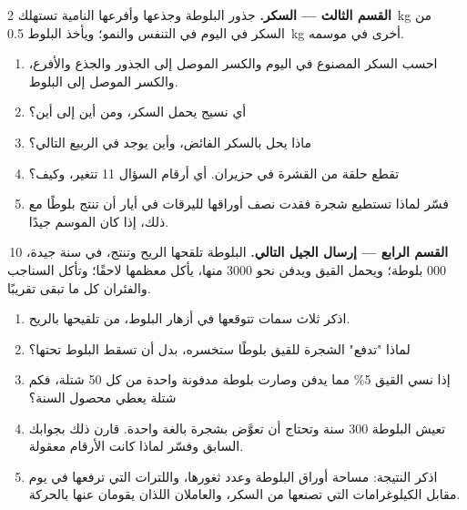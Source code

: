 \begin{problem}
\medskip
\noindent\textbf{القسم الثالث --- السكر.}
جذور البلوطة وجذعها وأفرعها النامية تستهلك \qty{2}{kg} من السكر في
اليوم في التنفس والنمو؛ ويأخذ البلوط \qty{0.5}{kg} أخرى في موسمه.
\begin{enumerate}[resume]
  \item احسب السكر المصنوع في اليوم والكسر الموصل إلى الجذور والجذع
        والأفرع، والكسر الموصل إلى البلوط.
  \item أي نسيج يحمل السكر، ومن أين إلى أين؟
  \item ماذا يحل بالسكر الفائض، وأين يوجد في الربيع التالي؟
  \item تقطع حلقة من القشرة في حزيران. أي أرقام السؤال 11 تتغير، وكيف؟
  \item فسّر لماذا تستطيع شجرة فقدت نصف أوراقها لليرقات في أيار أن
        تنتج بلوطًا مع ذلك، إذا كان الموسم جيدًا.
\end{enumerate}

\medskip
\noindent\textbf{القسم الرابع --- إرسال الجيل التالي.}
البلوطة تلقحها الريح وتنتج، في سنة جيدة، 10\,000 بلوطة؛ ويحمل القيق
ويدفن نحو 3000 منها، يأكل معظمها لاحقًا؛ وتأكل السناجب والفئران كل ما
تبقى تقريبًا.
\begin{enumerate}[resume]
  \item اذكر ثلاث سمات تتوقعها في أزهار البلوط، من تلقيحها بالريح.
  \item لماذا "تدفع" الشجرة للقيق بلوطًا ستخسره، بدل أن تسقط البلوط
        تحتها؟
  \item إذا نسي القيق 5\% مما يدفن وصارت بلوطة مدفونة واحدة من كل 50
        شتلة، فكم شتلة يعطي محصول السنة؟
  \item تعيش البلوطة 300 سنة وتحتاج أن تعوَّض بشجرة بالغة واحدة. قارن
        ذلك بجوابك السابق وفسّر لماذا كانت الأرقام معقولة.
  \item اذكر النتيجة: مساحة أوراق البلوطة وعدد ثغورها، واللترات التي
        ترفعها في يوم مقابل الكيلوغرامات التي تصنعها من السكر،
        والعاملان اللذان يقومان عنها بالحركة.
\end{enumerate}
\end{problem}
